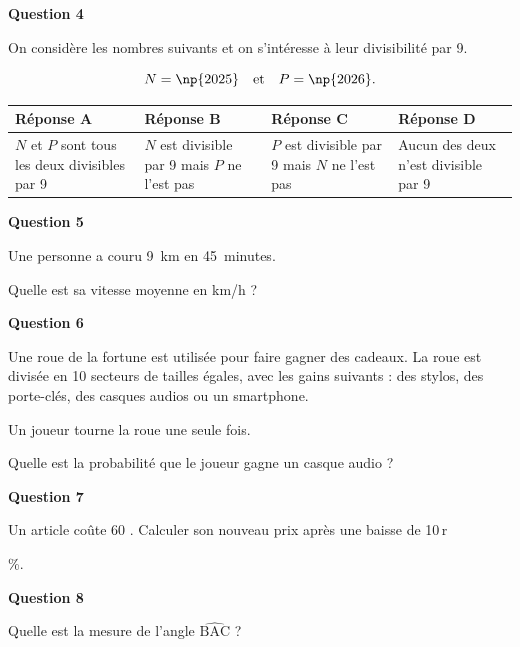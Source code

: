 \documentclass[11pt]{article}
\newcommand{\euro}{\eurologo{}}
\newcommand{\titreexo}[1]{\par\noindent\textbf{#1}\par\vspace{0.2em}}
\newenvironment{qcm}{%
\begin{center}\renewcommand\arraystretch{1.4}
\begin{tabular}{|>{\centering\arraybackslash}p{3.2cm}|>{\centering\arraybackslash}p{3.2cm}|>{\centering\arraybackslash}p{3.2cm}|>{\centering\arraybackslash}p{3.2cm}|}
\hline
}{%
\\ \hline
\end{tabular}
\renewcommand\arraystretch{1}
\end{center}
}
\begin{document}
\titreexo{Question 4}
On considère les nombres suivants et on s'intéresse à leur divisibilité par 9.

\[N = \np{2025} \quad \text{et} \quad P = \np{2026}.\]

\begin{qcm}
\textbf{Réponse A} & \textbf{Réponse B} & \textbf{Réponse C} & \textbf{Réponse D} \\
\hline
\small $N$ et $P$ sont tous les deux divisibles par 9 & $N$ est divisible par 9 mais $P$ ne l'est pas & $P$ est divisible par 9 mais $N$ ne l'est pas & Aucun des deux n'est divisible par 9
\end{qcm}

\titreexo{Question 5}
Une personne a couru 9~km en 45~minutes.

Quelle est sa vitesse moyenne en km/h ?

\titreexo{Question 6}

\begin{minipage}{0.68\textwidth}
Une roue de la fortune est utilisée pour faire gagner des cadeaux. La roue est divisée en 10 secteurs de tailles égales, avec les gains suivants : des stylos, des porte-clés, des casques audios ou un smartphone.

Un joueur tourne la roue une seule fois.

Quelle est la probabilité que le joueur gagne un casque audio ?
\end{minipage}%
\hfill
\begin{minipage}{0.28\textwidth}
\centering
{}
\end{minipage}

\titreexo{Question 7}
Un article coûte 60 \euro. Calculer son nouveau prix après une baisse de 10\,r

\%.

\titreexo{Question 8}

\begin{minipage}{0.62\textwidth}
Quelle est la mesure de l'angle $\widehat{\text{BAC}}$ ?
\end{minipage}%
\hfill
\begin{minipage}{0.34\textwidth}
\centering
{}
\end{minipage}
\end{document}
